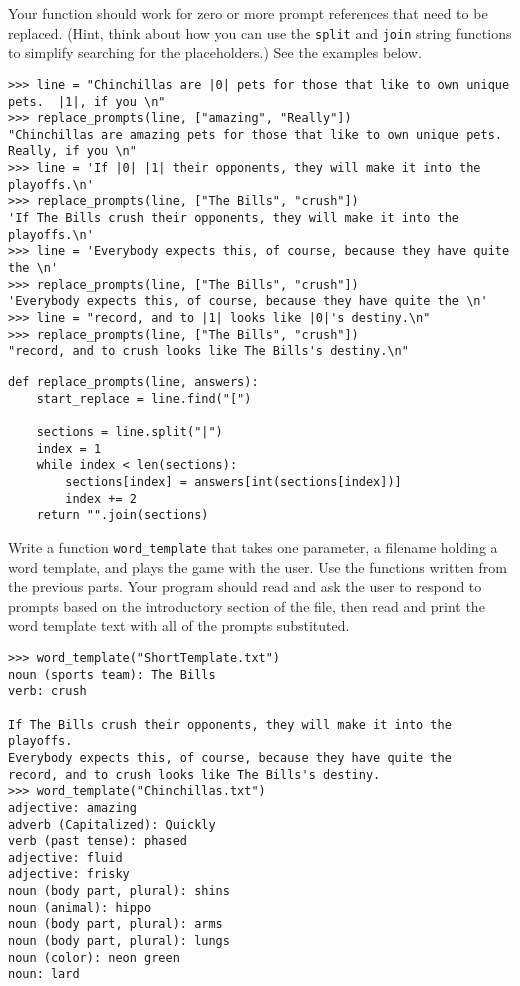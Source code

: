 \documentclass[10pt,answers]{exam}
\begin{document}
\begin{questions}
Your function should work for zero or more prompt references that need to be replaced.  
(Hint, think about how you can use the \lstinline{split} and \lstinline{join} string 
functions to simplify searching for the placeholders.)  See the examples below.

\begin{lstlisting}
>>> line = "Chinchillas are |0| pets for those that like to own unique pets.  |1|, if you \n"
>>> replace_prompts(line, ["amazing", "Really"])
"Chinchillas are amazing pets for those that like to own unique pets.  Really, if you \n"
>>> line = 'If |0| |1| their opponents, they will make it into the playoffs.\n'
>>> replace_prompts(line, ["The Bills", "crush"])
'If The Bills crush their opponents, they will make it into the playoffs.\n'
>>> line = 'Everybody expects this, of course, because they have quite the \n'
>>> replace_prompts(line, ["The Bills", "crush"])
'Everybody expects this, of course, because they have quite the \n'
>>> line = "record, and to |1| looks like |0|'s destiny.\n"
>>> replace_prompts(line, ["The Bills", "crush"])
"record, and to crush looks like The Bills's destiny.\n"
\end{lstlisting}

\begin{solution}
\begin{lstlisting}
def replace_prompts(line, answers):
    start_replace = line.find("[")

    sections = line.split("|")
    index = 1
    while index < len(sections):
        sections[index] = answers[int(sections[index])]
        index += 2
    return "".join(sections)
\end{lstlisting}
\end{solution}

\question Write a function \lstinline{word_template} that takes one parameter, a filename holding 
a word template, and plays the game with the user.  Use the functions written from the previous 
parts.  Your program should read and ask the user to respond to prompts based on the introductory 
section of the file, then read and print the word template text with all of the prompts substituted.  

\begin{lstlisting}
>>> word_template("ShortTemplate.txt")
noun (sports team): The Bills
verb: crush

If The Bills crush their opponents, they will make it into the playoffs.
Everybody expects this, of course, because they have quite the 
record, and to crush looks like The Bills's destiny.
>>> word_template("Chinchillas.txt")
adjective: amazing
adverb (Capitalized): Quickly
verb (past tense): phased
adjective: fluid
adjective: frisky
noun (body part, plural): shins
noun (animal): hippo
noun (body part, plural): arms
noun (body part, plural): lungs
noun (color): neon green
noun: lard


\end{lstlisting}
\end{questions}
\end{document}
